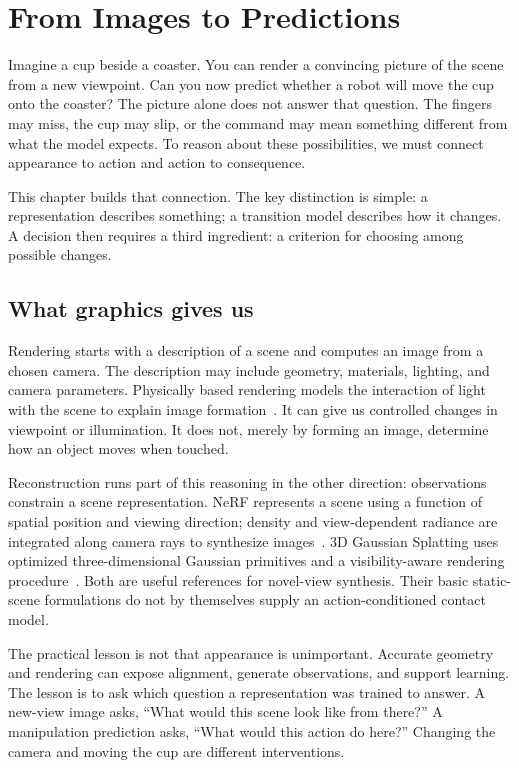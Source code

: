 \chapter{From Images to Predictions}
\label{ch:foundations}

Imagine a cup beside a coaster. You can render a convincing picture of the scene from a new viewpoint. Can you now predict whether a robot will move the cup onto the coaster? The picture alone does not answer that question. The fingers may miss, the cup may slip, or the command may mean something different from what the model expects. To reason about these possibilities, we must connect appearance to action and action to consequence.

This chapter builds that connection. The key distinction is simple: a representation describes something; a transition model describes how it changes. A decision then requires a third ingredient: a criterion for choosing among possible changes.

\section{What graphics gives us}
Rendering starts with a description of a scene and computes an image from a chosen camera. The description may include geometry, materials, lighting, and camera parameters. Physically based rendering models the interaction of light with the scene to explain image formation~\citep{pbrt}. It can give us controlled changes in viewpoint or illumination. It does not, merely by forming an image, determine how an object moves when touched.

Reconstruction runs part of this reasoning in the other direction: observations constrain a scene representation. NeRF represents a scene using a function of spatial position and viewing direction; density and view-dependent radiance are integrated along camera rays to synthesize images~\citep{nerf}. 3D Gaussian Splatting uses optimized three-dimensional Gaussian primitives and a visibility-aware rendering procedure~\citep{gaussians}. Both are useful references for novel-view synthesis. Their basic static-scene formulations do not by themselves supply an action-conditioned contact model.

The practical lesson is not that appearance is unimportant. Accurate geometry and rendering can expose alignment, generate observations, and support learning. The lesson is to ask which question a representation was trained to answer. A new-view image asks, ``What would this scene look like from there?'' A manipulation prediction asks, ``What would this action do here?'' Changing the camera and moving the cup are different interventions.

